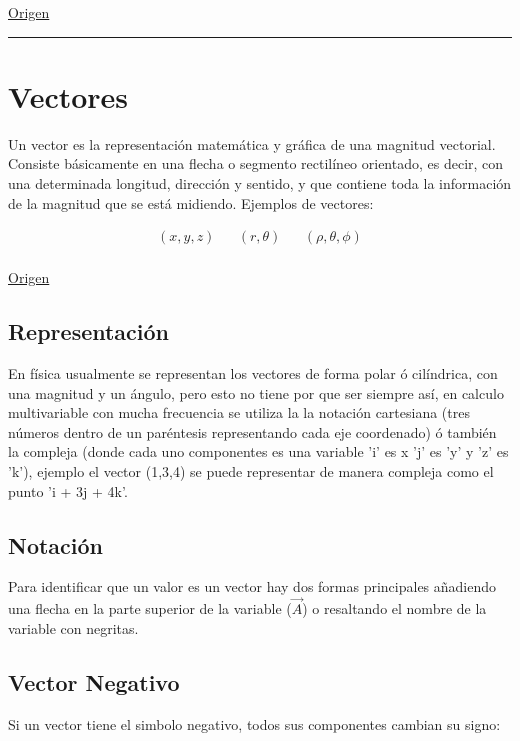 \documentclass{article}
\begin{document}
\href{https://temasdecalculo.com/2017/12/18/4-14-coordenadas-cilindricas-y-coordenadas-esfericas-calculo-vectorial/}{Origen}

\noindent\rule{\textwidth}{0.5pt}

\section{Vectores}
\label{sec:orgfed372d}
Un vector es la representación matemática y gráfica de una magnitud vectorial. Consiste básicamente en una flecha o segmento rectilíneo orientado, es decir, con una determinada longitud, dirección y sentido, y que contiene toda la información de la magnitud que se está midiendo. Ejemplos de vectores: 

\[\begin{aligned}
  (x,y,z) && (r,\theta) && (\rho, \theta, \phi) \\
\end{aligned}\] 

\href{https://ingemecanica.com/tutoriales/calculo\_vectorial.html}{Origen}

\subsection{Representación}
\label{sec:org26cbbdb}
En física usualmente se representan los vectores de forma polar ó cilíndrica, con una magnitud y un ángulo, pero esto no tiene por que ser siempre así, en calculo multivariable con mucha frecuencia se utiliza la la notación cartesiana (tres números dentro de un paréntesis representando cada eje coordenado) ó también la compleja (donde cada uno componentes es una variable 'i' es x 'j' es 'y' y 'z' es 'k'), ejemplo el vector (1,3,4) se puede representar de manera compleja como el punto 'i + 3j + 4k'. 

\subsection{Notación}
\label{sec:org260e883}
Para identificar que un valor es un vector hay dos formas principales añadiendo una flecha en la parte superior de la variable (\(\vec{A}\)) o resaltando el nombre de la variable con negritas. 

\subsection{Vector Negativo}
\label{sec:org8bd2d61}
Si un vector tiene el simbolo negativo, todos sus componentes cambian su signo: 
\end{document}
